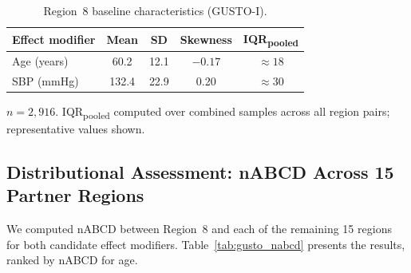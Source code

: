 \begin{table}[ht]
\caption{Region~8 baseline characteristics (GUSTO-I).\label{tab:gusto_r8}}
\begin{tabular*}{\textwidth}{@{\extracolsep\fill}lcccc@{}}
\toprule
\textbf{Effect modifier} & \textbf{Mean} & \textbf{SD} & \textbf{Skewness} & \textbf{IQR\textsubscript{pooled}} \\
\midrule
Age (years) & 60.2 & 12.1 & $-0.17$ & $\approx 18$ \\
SBP (mmHg) & 132.4 & 22.9 & 0.20 & $\approx 30$ \\
\bottomrule
\end{tabular*}
\begin{tablenotes}
\item $n = 2{,}916$. IQR\textsubscript{pooled} computed over combined samples across all region pairs; representative values shown.
\end{tablenotes}
\end{table}

\subsection{Distributional Assessment: nABCD Across 15 Partner Regions}\label{sec:app_nabcd}

We computed nABCD between Region~8 and each of the remaining 15 regions for both candidate effect modifiers. Table~\ref{tab:gusto_nabcd} presents the results, ranked by nABCD for age.


